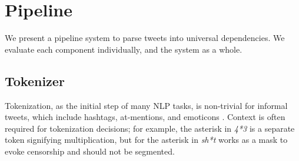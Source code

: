 \documentclass[11pt,a4paper]{article}
\begin{document}
%		



\section{Pipeline}
\label{sec:parsing}

We present a pipeline system to parse tweets into universal
dependencies.  We evaluate each component individually, and the system
as a whole.

\subsection{Tokenizer} \label{sec:tok}
Tokenization, as the initial step of many NLP tasks, is non-trivial for
informal tweets, which include hashtags, at-mentions, and emoticons
\cite{ICWSM101540}.  Context is often required for tokenization
decisions; for example,
the asterisk in {\it 4*3} is a separate token signifying
multiplication, but for the asterisk in {\it sh*t}
works as a mask to evoke censorship and should not be segmented.
\end{document}
